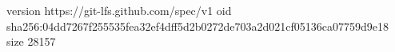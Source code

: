 version https://git-lfs.github.com/spec/v1
oid sha256:04dd7267f255535fea32ef4dff5d2b0272de703a2d021cf05136ca07759d9e18
size 28157
